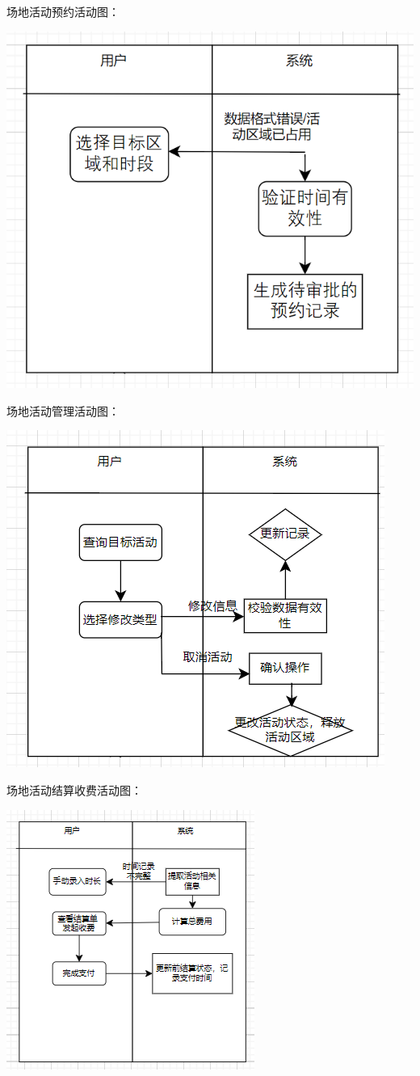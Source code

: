 \documentclass[]{article}
\let\oldincludegraphics\includegraphics
\renewcommand{\includegraphics}[2][]{%
  \begin{center}\oldincludegraphics[#1]{#2}\end{center}%
}
\begin{document}
场地活动预约活动图：
\includegraphics{media/2.5/image12.png}

场地活动管理活动图：
\includegraphics{media/2.5/image13.png}

场地活动结算收费活动图：
\includegraphics{media/2.5/image14.png}
\end{document}
